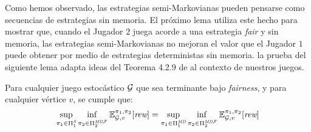%	
%	



Como hemos observado, las estrategias semi-Markovianas pueden pensarse como secuencias de estrategias sin memoria. El próximo lema utiliza este hecho para mostrar que, cuando el Jugador $2$ juega acorde a una estrategia \textit{fair} y sin memoria,  las estrategias semi-Markovianas no mejoran el valor que el Jugador $1$ puede obtener por medio de estrategias deterministas sin memoria. la prueba del siguiente lema adapta ideas del Teorema 4.2.9 de \cite{FilarV96} al contexto de nuestros juegos.%

\begin{lemma}\label{lm:semimarkov-to-detmemoryless} Para cualquier juego estocástico $\mathcal{G}$  que sea terminante bajo \textit{fairness}, y para cualquier vértice $v$, se cumple que:
\[\adjustlimits
	\sup_{\strat{1} \in \SemiMarkovStrats{1}} \inf_{\strat{2} \in \DetMemorylessFairStrats{2}} \Expect{\strat{1}}{\strat{2}}_{\StochG,v}[\Rewards]
	= \adjustlimits
	\sup_{\strat{1} \in \DetMemorylessStrats{1}} \inf_{\strat{2} \in \DetMemorylessFairStrats{2}} \Expect{\strat{1}}{\strat{2}}_{\StochG,v}[\Rewards]
\]
\end{lemma}

